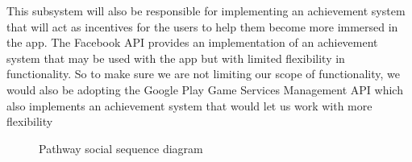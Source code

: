 \documentclass{article}
\begin{document}
This subsystem will also be responsible for implementing an achievement system that will act as incentives for the users to help them become more immersed in the app. The Facebook API provides an implementation of an achievement system that may be used with the app but with limited flexibility in functionality. So to make sure we are not limiting our scope of functionality, we would also be adopting the Google Play Game Services Management API which also implements an achievement system that would let us work with more flexibility
\begin{figure}[H]
    \centering
    \begin{center}
    \end{center}
    \caption{Pathway social sequence diagram}
    \label{fig:my_label}
\end{figure}
\end{document}
